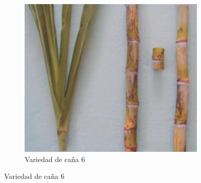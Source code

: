 \documentclass{article}%
\begin{document}
\begin{figure}[h!]
\begin{subfigure}{0.33\linewidth}
\includegraphics[width=0.95\linewidth]{Cana/CC85-57.png}%
\caption{Variedad de caña 6}%
\end{subfigure}%
\linebreak%
\newpage%
\end{figure}

%
\end{document}
